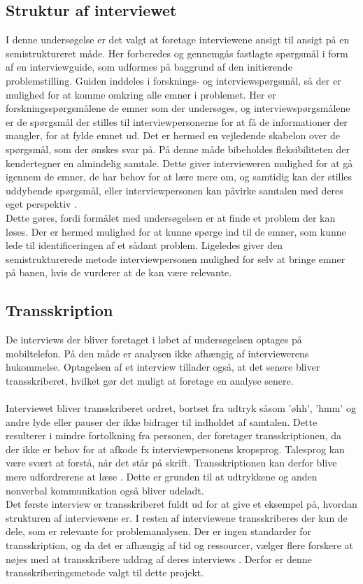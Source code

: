 \subsection {Struktur af interviewet}
I denne undersøgelse er det valgt at foretage interviewene ansigt til ansigt på en semistruktureret måde. Her forberedes og gennemgås fastlagte spørgsmål i form af en interviewguide, som udformes på baggrund af den initierende problemstilling. Guiden inddeles i forsknings- og interviewspørgsmål, så der er mulighed for at komme omkring alle emner i problemet. Her er forskningsspørgsmålene de emner som der undersøges, og interviewspørgsmålene er de spørgsmål der stilles til interviewpersonerne for at få de informationer der mangler, for at fylde emnet ud. Det er hermed en vejledende skabelon over de spørgsmål, som der ønskes svar på. På denne måde bibeholdes fleksibiliteten der kendertegner en almindelig samtale. Dette giver intervieweren mulighed for at gå igennem de emner, de har behov for at lære mere om, og samtidig kan der stilles uddybende spørgsmål, eller interviewpersonen kan påvirke samtalen med deres eget perspektiv \citep{brinkmann2014}.\\
Dette gøres, fordi formålet med undersøgelsen er at finde et problem der kan løses. Der er hermed mulighed for at kunne spørge ind til de emner, som kunne lede til identificeringen af et sådant problem. Ligeledes giver den semistrukturerede metode interviewpersonen mulighed for selv at bringe emner på banen, hvis de vurderer at de kan være relevante.
\\
\subsection{Transskription}
De interviews der bliver foretaget i løbet af undersøgelsen optages på mobiltelefon. På den måde er analysen ikke afhængig af interviewerens hukommelse. Optagelsen af et interview tillader også, at det senere bliver transskriberet, hvilket gør det muligt at foretage en analyse senere. 
\\
\\
Interviewet bliver transskriberet ordret, bortset fra udtryk såsom 'øhh', 'hmm' og andre lyde eller pauser der ikke bidrager til indholdet af samtalen. Dette resulterer i mindre fortolkning fra personen, der foretager transskriptionen, da der ikke er behov for at afkode fx interviewpersonens kropsprog. Talesprog kan være svært at forstå, når det står på skrift. Transskriptionen kan derfor blive mere udfordrerene at læse \citep{kvale2015}. Dette er grunden til at udtrykkene og anden nonverbal kommunikation også bliver udeladt. 
\\
Det første interview er transskriberet fuldt ud for at give et eksempel på, hvordan strukturen af interviewene er. I resten af interviewene transskriberes der kun de dele, som er relevante for problemanalysen. Der er ingen standarder for transskription, og da det er afhængig af tid og ressourcer, vælger flere forskere at nøjes med at transskribere uddrag af deres interviews \citep{brinkmann2014}\citep{kvale2015}. Derfor er denne transskriberingsmetode valgt til dette projekt.


